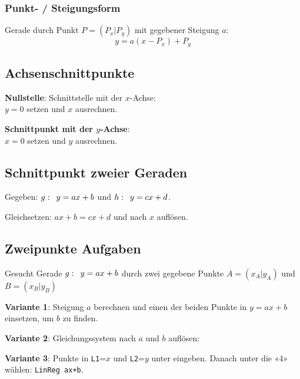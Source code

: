 \begin{multicols}{2}
\ifdefined\versionHECH%
\subsubsection*{Punkt- / Steigungsform}
Gerade durch Punkt $P=(P_x|P_y)$ mit gegebener Steigung $a$:
$$y = a(x-P_x) + P_y$$
\fi

\subsection*{Achsenschnittpunkte}

\textbf{Nullstelle}: Schnittstelle mit der $x$-Achse:\\
$y=0$ setzen und $x$ ausrechnen.


\textbf{Schnittpunkt mit der $y$-Achse}:\\
$x=0$ setzen und $y$ ausrechnen.


\subsection*{Schnittpunkt zweier Geraden}
Gegeben: $g\-:\,\,\, y=ax+b$ und $h\-:\,\,\, y=cx+d$.

Gleichsetzen: $ax+b = cx+d$ und nach $x$ auflösen.






\subsection*{Zweipunkte Aufgaben}


Gesucht Gerade $g\-: \,\,\, y=ax+b$ durch zwei gegebene Punkte $A=(x_A|y_A)$ und $B=(x_B|y_B)$


\textbf{Variante 1}: Steigung $a$ berechnen und einen der beiden Punkte in
$y=ax+b$ einsetzen, um $b$ zu finden.


\textbf{Variante 2}: Gleichungssystem nach $a$ und $b$ auf\/lösen:

\textbf{Variante 3}: Punkte in \texttt{L1}=$x$ und \texttt{L2}=$y$
unter  eingeben. Danach unter
 die «4» wählen:
\texttt{LinReg ax+b}.

\end{multicols}

